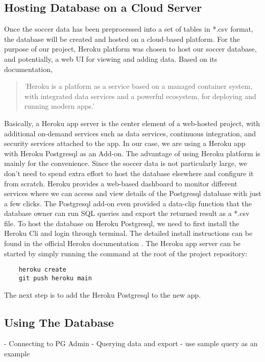 \subsection{Hosting Database on a Cloud Server}
Once the soccer data has been preprocessed into a set of tables in *.csv format, the database will be created and hosted on a cloud-based platform. For the purpose of our project, Heroku platform was chosen to host our soccer database, and potentially, a web UI for viewing and adding data.
Based on its documentation, \begin{quote}
    'Heroku is a platform as a service based on a managed container system, with integrated data services and a powerful ecosystem, for deploying and running modern apps.' \cite{b10}
\end{quote} Basically, a Heroku app server is the center element of a web-hosted project, with additional on-demand services such as data services, continuous integration, and security services attached to the app. In our case, we are using a Heroku app with Heroku Postgresql as an Add-on. The advantage of using Heroku platform is mainly for the convenience. Since the soccer data is not particularly large, we don't need to spend extra effort to host the database elsewhere and configure it from scratch. Heroku provides a web-based dashboard to monitor different services where we can access and view details of the Postgresql database with just a few clicks. The Postgresql add-on even provided a data-clip function that the database owner can run SQL queries and export the returned result as a *.csv file.
To host the database on Heroku Postgresql, we need to first install the Heroku Cli and login through terminal. The detailed install instructions can be found in the official Heroku documentation \cite{b11}. The Heroku app server can be started by simply running the command at the root of the project repository: 
\begin{verbatim}
    heroku create
    git push heroku main
\end{verbatim}
The next step is to add the Heroku Postgresql to the new app. 
\subsection{Using The Database}
- Connecting to PG Admin 
- Querying data and export
    - use sample query as an example